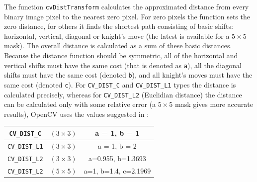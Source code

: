 \begin{description}
\end{description}

The function \texttt{cvDistTransform} calculates the approximated
distance from every binary image pixel to the nearest zero pixel.
For zero pixels the function sets the zero distance, for others it
finds the shortest path consisting of basic shifts: horizontal,
vertical, diagonal or knight's move (the latest is available for a
$5\times 5$ mask). The overall distance is calculated as a sum of these
basic distances. Because the distance function should be symmetric,
all of the horizontal and vertical shifts must have the same cost (that
is denoted as \texttt{a}), all the diagonal shifts must have the
same cost (denoted \texttt{b}), and all knight's moves must have
the same cost (denoted \texttt{c}). For \texttt{CV\_DIST\_C} and
\texttt{CV\_DIST\_L1} types the distance is calculated precisely,
whereas for \texttt{CV\_DIST\_L2} (Euclidian distance) the distance
can be calculated only with some relative error (a $5\times 5$ mask
gives more accurate results), OpenCV uses the values suggested in
\cite{Borgefors86}:


\begin{tabular}{| c | c | c |}
\hline
\texttt{CV\_DIST\_C}  & $(3\times 3)$ & a = 1, b = 1\\ \hline
\texttt{CV\_DIST\_L1} & $(3\times 3)$ & a = 1, b = 2\\ \hline
\texttt{CV\_DIST\_L2} & $(3\times 3)$ & a=0.955, b=1.3693\\ \hline
\texttt{CV\_DIST\_L2} & $(5\times 5)$ & a=1, b=1.4, c=2.1969\\ \hline
\end{tabular}

